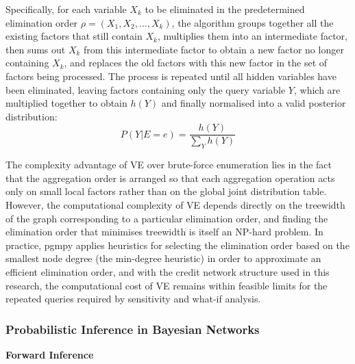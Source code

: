 \begin{enumerate}
    \hspace{0.5cm} Specifically, for each variable $X_k$ to be eliminated in the predetermined elimination order $\rho=(X_1,X_2,\ldots,X_k)$, the algorithm groups together all the existing factors that still contain $X_k$, multiplies them into an intermediate factor, then sums out $X_k$ from this intermediate factor to obtain a new factor no longer containing $X_k$, and replaces the old factors with this new factor in the set of factors being processed. The process is repeated until all hidden variables have been eliminated, leaving factors containing only the query variable $Y$, which are multiplied together to obtain $h(Y)$ and finally normalised into a valid posterior distribution:
    \begin{equation} 
        P(Y | E = e) = \frac{h(Y)}{\sum_Y h(Y)}
    \end{equation}

\end{enumerate}

The complexity advantage of VE over brute-force enumeration lies in the fact that the aggregation order is arranged so that each aggregation operation acts only on small local factors rather than on the global joint distribution table. However, the computational complexity of VE depends directly on the treewidth of the graph corresponding to a particular elimination order, and finding the elimination order that minimises treewidth is itself an NP-hard problem. In practice, pgmpy applies heuristics for selecting the elimination order based on the smallest node degree (the min-degree heuristic) in order to approximate an efficient elimination order, and with the credit network structure used in this research, the computational cost of VE remains within feasible limits for the repeated queries required by sensitivity and what-if analysis.

\subsubsection{Probabilistic Inference in Bayesian Networks}
\vspace{1em}
\noindent
\textbf{Forward Inference}

